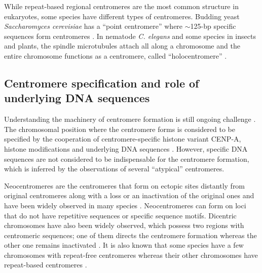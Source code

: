   While repeat-based regional centromeres are the most common structure in eukaryotes, some species have different types of centromeres. Budding yeast \textit{Saccharomyces cerevisiae} has a ``point centromere'' where $\sim$125-bp specific sequences form centromeres \cite{Hegemann1993}. In nematode \textit{C. elegans} and some species in insects and plants, the spindle microtubules attach all along a chromosome and the entire chromosome functions as a centromere, called ``holocentromere'' \cite{Plohl2014, Fukagawa2014}.


\subsection*{Centromere specification and role of underlying DNA sequences}
  Understanding the machinery of centromere formation is still ongoing challenge \cite{Plohl2014, Fukagawa2014, McKinley2016}. The chromosomal position where the centromere forms is considered to be specified by the cooperation of centromere-specific histone variant CENP-A, histone modifications and underlying DNA sequences \cite{Fukagawa2014}. However, specific DNA sequences are not considered to be indispensable for the centromere formation, which is inferred by the observations of several ``atypical'' centromeres.

  Neocentromeres are the centromeres that form on ectopic sites distantly from original centromeres along with a loss or an inactivation of the original ones and have been widely observed in many species \cite{Marshall2008, Scott2014}. Neocentromeres can form on loci that do not have repetitive sequences or specific sequence motifs. Dicentric chromosomes have also been widely observed, which possess two regions with centromeric sequences; one of them directs the centromere formation whereas the other one remains inactivated \cite{Earnshaw1985, Steiner1994, Han2006}. It is also known that some species have a few chromosomes with repeat-free centromeres whereas their other chromosomes have repeat-based centromeres \cite{Piras2010, Shang2010, Locke2011}.

